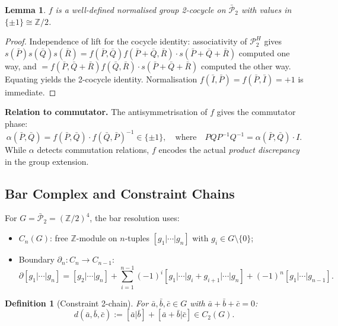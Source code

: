 \documentclass[11pt]{article}
\newtheorem{lemma}[theorem]{Lemma}
\newtheorem{definition}[theorem]{Definition}
\begin{document}
\begin{lemma}
$f$ is a well-defined normalised group 2-cocycle on $\bar{\mathcal{P}}_2$
with values in $\{\pm 1\} \cong \mathbb{Z}/2$.
\end{lemma}

\begin{proof}
Independence of lift for the cocycle identity: associativity of $\mathcal{P}_2^H$
gives $s(\bar{P})s(\bar{Q})s(\bar{R}) = f(\bar{P},\bar{Q})f(\bar{P}+\bar{Q},\bar{R}) \cdot s(\bar{P}+\bar{Q}+\bar{R})$
computed one way, and $= f(\bar{P},\bar{Q}+\bar{R})f(\bar{Q},\bar{R}) \cdot s(\bar{P}+\bar{Q}+\bar{R})$
computed the other way. Equating yields the 2-cocycle identity.
Normalisation $f(\bar{I},\bar{P}) = f(\bar{P},\bar{I}) = +1$ is immediate.
\end{proof}

\textbf{Relation to commutator.}
The antisymmetrisation of $f$ gives the commutator phase:
\begin{equation}
\label{eq:f-to-comm}
  \alpha(\bar{P}, \bar{Q}) = f(\bar{P}, \bar{Q}) \cdot f(\bar{Q}, \bar{P})^{-1} \in \{\pm 1\}, \quad\text{where}\quad PQP^{-1}Q^{-1} = \alpha(\bar{P}, \bar{Q}) \cdot I.
\end{equation}
While $\alpha$ detects commutation relations, $f$ encodes the actual
\emph{product discrepancy} in the group extension.

\subsection{Bar Complex and Constraint Chains}
\label{app:bar-chains}

For $G = \bar{\mathcal{P}}_2 = (\mathbb{Z}/2)^4$, the bar resolution uses:
\begin{itemize}
\item $C_n(G)$: free $\mathbb{Z}$-module on $n$-tuples $[g_1|\cdots|g_n]$
      with $g_i \in G \setminus \{0\}$;
\item Boundary $\partial_n: C_n \to C_{n-1}$:
\[
  \partial[g_1|\cdots|g_n] = [g_2|\cdots|g_n] + \sum_{i=1}^{n-1}
  (-1)^i[g_1|\cdots|g_i+g_{i+1}|\cdots|g_n] + (-1)^n[g_1|\cdots|g_{n-1}].
\]
\end{itemize}

\begin{definition}[Constraint 2-chain]
For $\bar{a}, \bar{b}, \bar{c} \in G$ with $\bar{a} + \bar{b} + \bar{c} = 0$:
\[
  d(\bar{a}, \bar{b}, \bar{c}) := [\bar{a}|\bar{b}] + [\bar{a}+\bar{b}|\bar{c}]
  \in C_2(G).
\]
\end{definition}
\end{document}
